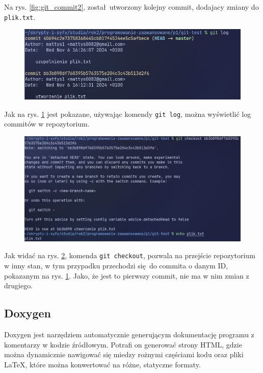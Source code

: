 Na rys. \ref{fig:git_commit2}, został utworzony kolejny commit, dodajacy zmiany do \texttt{plik.txt}.

\begin{figure}[H]
	\centering
	\includegraphics[width=1\textwidth]{images/git_log.png}
	\caption{}
	\label{fig:git_log}
\end{figure}

Jak na rys. \ref{fig:git_log} jest pokazane, używając komendy \texttt{git log}, można wyświetlić log commitów w repozytorium.

\begin{figure}[H]
	\centering
	\includegraphics[width=1\textwidth]{images/git_checkout.png}
	\caption{}
	\label{fig:git_checkout}
\end{figure}

Jak widać na rys. \ref{fig:git_checkout}, komenda \texttt{git checkout}, pozwala na przejście repozytorium w inny stan, w tym przypadku przechodzi się do commita o danym ID, pokazanym na rys. \ref{fig:git_log}. Jako, że jest to pierwszy commit, nie ma w nim zmian z drugiego.

\subsection{Doxygen}
Doxygen\cite{doxygensite} jest narzędziem automatycznie generującym dokumentację programu z komentarzy w kodzie źródłowym. Potrafi on generować strony HTML, gdzie można dynamicznie nawigować się miedzy rożnymi częściami kodu oraz pliki \LaTeX, które można konwertować na różne, statyczne formaty.

